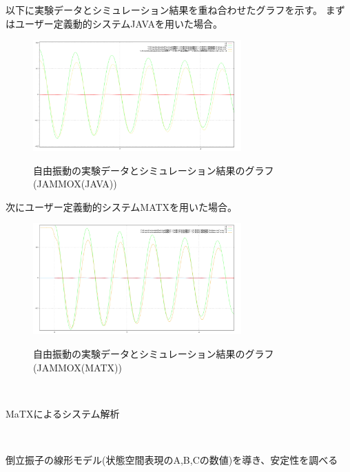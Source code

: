 \documentclass{jarticle}
\begin{document}
\begin{enumerate}
\begin{enumerate}
\begin{enumerate}
\begin{enumerate}
						以下に実験データとシミュレーション結果を重ね合わせたグラフを示す。
						まずはユーザー定義動的システムJAVAを用いた場合。
						\begin{figure}[htbp]
						\begin{center}
							\includegraphics[width=8cm]{gazo/FreePendulumSimulationJAMOXJverifi.pdf}\\
						\end{center}
						\caption{自由振動の実験データとシミュレーション結果のグラフ(JAMMOX(JAVA))}
						\end{figure}
						次にユーザー定義動的システムMATXを用いた場合。
						\begin{figure}[htbp]
						\begin{center}
							\includegraphics[width=8cm]{gazo/FreePendulumSimulationJAMOXMverifi.pdf}\\
						\end{center}
						\caption{自由振動の実験データとシミュレーション結果のグラフ(JAMMOX(MATX))}
						\end{figure}
					
				\end{enumerate}
			\end{enumerate}
		\end{enumerate}

		{\LARGE\item {}}\\
		\begin{enumerate}
			{\Large\item MaTXによるシステム解析}\\
			\begin{enumerate}
				{\large\item 倒立振子の線形モデル(状態空間表現のA,B,Cの数値)を導き、安定性を調べる}\\
				

\end{enumerate}
\end{enumerate}
\end{enumerate}
\end{document}

